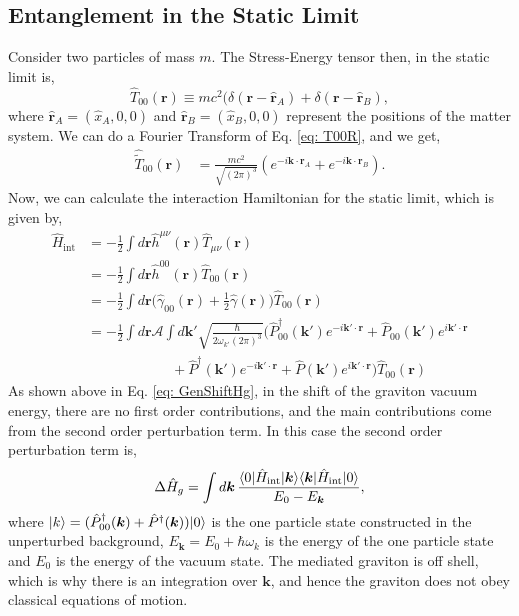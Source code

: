 \documentclass[11pt]{article}
\DeclarePairedDelimiter\bra{\langle}{\rvert}
\DeclarePairedDelimiter\ket{\lvert}{\rangle}
\newcommand{\munu}{\mu\nu}
\newcommand{\Hint}{\hat{H}_{\text{int}}}
\begin{document}
\subsection{Entanglement in the Static Limit}
Consider two particles of mass $m$. The Stress-Energy tensor then, in the static limit is,
\begin{equation}
    \hat{T}_{00}(\bm{r}) \equiv mc^2 (\delta(\bm{r} - \hat{\bm{r}}_A) + \delta(\bm{r} - \hat{\bm{r}}_B),
    \label{eq: T00R}
\end{equation}
where $\hat{\bm{r}}_A = (\hat{x}_A, 0, 0)$ and $\hat{\bm{r}}_B = (\hat{x}_B, 0, 0)$ represent the positions of the matter system. We can do a Fourier Transform of Eq. \ref{eq: T00R}, and we get,
\begin{equation}
    \begin{aligned}
        \hat{\tilde{T}}_{00}(\bm{r}) &= \frac{mc^2}{\sqrt{(2\pi)^3}} (e^{-i\bm{k}\cdot\bm{r}_A} + e^{-i\bm{k}\cdot\bm{r}_B}). 
    \end{aligned}
    \label{eq: T00K}
\end{equation}
Now, we can calculate the interaction Hamiltonian for the static limit, which is given by,
\begin{equation}
    \begin{aligned}
        \Hint &= -\frac{1}{2} \int d\bm{r} \hat{h}^{\munu}(\bm{r})\hat{T}_{\munu}(\bm{r}) \\
        &= -\frac{1}{2} \int d\bm{r} \hat{h}^{00}(\bm{r})\hat{T}_{00}(\bm{r}) \\
        &= -\frac{1}{2} \int d\bm{r} \Big(\hat{\gamma}_{00}(\bm{r}) + \frac{1}{2}\hat{\gamma}(\bm{r})\Big)\hat{T}_{00}(\bm{r}) \\
        &= -\frac{1}{2} \int d{\bm{r}} \mathcal{A}\int d\bm{k'} \sqrt{\frac{\hbar}{2\omega_{k'} (2\pi)^3}}\Big(\hat{P}_{00}^{\dagger}(\bm{k'})e^{-i\bm{k'}\cdot\bm{r}} + \hat{P}_{00}(\bm{k'})e^{i\bm{k'}\cdot\bm{r}} \\ 
        &\qquad\qquad\qquad+ \hat{P}^{\dagger}(\bm{k'})e^{-i\bm{k'}\cdot\bm{r}} + \hat{P}(\bm{k'})e^{i\bm{k'}\cdot\bm{r}}\Big)\hat{T}_{00}(\bm{r})
    \end{aligned}
\end{equation}
As shown above in Eq. \ref{eq: GenShiftHg}, in the shift of the graviton vacuum energy, there are no first order contributions, and the main contributions come from the second order perturbation term. In this case the second order perturbation term is,
\begin{equation}
    \Delta \hat{H}_{g} = \int d\bm{k}\,\frac{\bra{0}\Hint\ket{\bm{k}}\bra{\bm{k}}\Hint\ket{0}}{E_0 - E_{\bm{k}}},
\end{equation}
where $\ket{k} = (\hat{P}_{00}^{\dagger}(\bm{k}) + \hat{P}^{\dagger}(\bm{k})) \ket{0}$ is the one particle state constructed in the unperturbed background, $E_{\bm{k}} = E_0 + \hbar\omega_k$ is the energy of the one particle state and $E_0$ is the energy of the vacuum state. The mediated graviton is off shell, which is why there is an integration over $\bm{k}$, and hence the graviton does not obey classical equations of motion.
\end{document}

